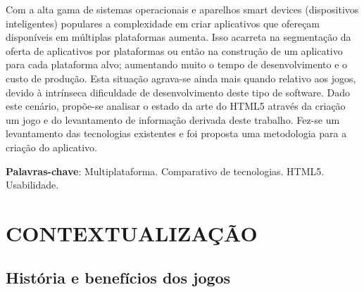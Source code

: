 \documentclass{article}
\begin{document}
Com a alta gama de sistemas operacionais e aparelhos smart devices (dispositivos inteligentes) populares a complexidade em criar aplicativos que ofereçam disponíveis em múltiplas plataformas aumenta. Isso acarreta na segmentação da oferta de aplicativos por plataformas ou então na construção de um aplicativo para cada plataforma alvo; aumentando muito o tempo de desenvolvimento e o custo de produção. Esta situação agrava-se ainda mais quando relativo aos jogos, devido à intrínseca dificuldade de desenvolvimento deste tipo de software. Dado este cenário, propõe-se analisar o estado da arte do HTML5 através da criação um jogo e do levantamento de informação derivada deste trabalho.  Fez-se um levantamento das tecnologias existentes e foi proposta uma metodologia para a criação do aplicativo.

\textbf{Palavras-chave}: Multiplataforma. Comparativo de tecnologias. HTML5. Usabilidade.

\newpage

\listoffigures
\listoftables
\newpage

\tableofcontents
\newpage

\section{CONTEXTUALIZAÇÃO}
\subsection{História e benefícios dos jogos}
\end{document}
